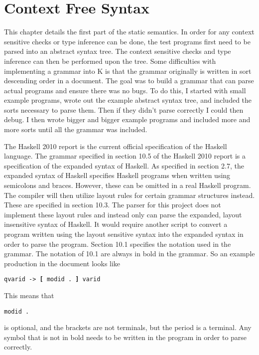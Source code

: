 \chapter{Context Free Syntax}
This chapter details the first part of the static semantics. In order for any context sensitive checks or type inference can be done, the test programs first need to be parsed into an abstract syntax tree. The context sensitive checks and type inference can then be performed upon the tree.
Some difficulties with implementing a grammar into K is that the grammar originally is written in sort descending order in a document. The goal was to build a grammar that can parse actual programs and ensure there was no bugs. To do this, I started with small example programs, wrote out the example abstract syntax tree, and included the sorts necessary to parse them. Then if they didn't parse correctly I could then debug. I then wrote bigger and bigger example programs and included more and more sorts until all the grammar was included.

The Haskell 2010 report is the current official specification of the Haskell language. %
The grammar specified in section 10.5 of the Haskell 2010 report is a specification of the expanded syntax of Haskell.
As specified in section 2.7, the expanded syntax of Haskell specifies Haskell programs when written using semicolons and braces. However, these can be omitted in a real Haskell program. The compiler will then utilize layout rules for certain grammar structures instead. These are specified in section 10.3.
The parser for this project does not implement these layout rules and instead only can parse the expanded, layout insensitive syntax of Haskell. It would require another script to convert a program written using the layout sensitive syntax into the expanded syntax in order to parse the program.
Section 10.1 specifies the notation used in the grammar.
The notation of 10.1 are always in bold in the grammar.
So an example production in the document looks like

\texttt{qvarid -> \textbf{[} modid . \textbf{]} varid}

This means that 
\begin{lstlisting}
modid .
\end{lstlisting}
is optional, and the brackets are not terminals, but the period is a terminal. Any symbol that is not in bold needs to be written in the program in order to parse correctly.

